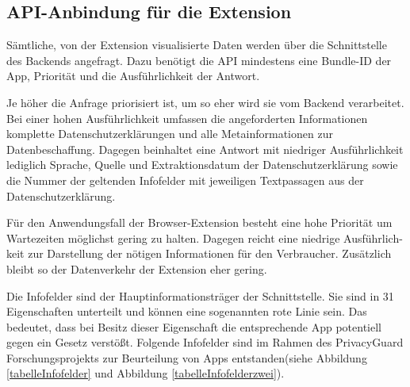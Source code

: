\subsection{API-Anbindung für die Extension}
\label{ss:apianbindung}

Sämtliche, von der Extension visualisierte Daten werden über die Schnittstelle des Backends angefragt. Dazu benötigt die API mindestens eine Bundle-ID der App, Priorität und die Ausführlichkeit der Antwort.

Je höher die Anfrage priorisiert ist, um so eher wird sie vom Backend verarbeitet. 
Bei einer hohen Ausführlichkeit umfassen die angeforderten Informationen komplette Datenschutzerklärungen und alle Metainformationen zur Datenbeschaffung. Dagegen beinhaltet eine Antwort mit niedriger Ausführlichkeit lediglich Sprache, Quelle und Extraktionsdatum der Datenschutzerklärung sowie die Nummer der geltenden Infofelder mit jeweiligen Textpassagen aus der Datenschutzerklärung.

Für den Anwendungsfall der Browser-Extension besteht eine hohe Priorität um Wartezeiten möglichst gering zu halten. Dagegen reicht eine niedrige Ausführlich-keit zur Darstellung der nötigen Informationen für den Verbraucher. Zusätzlich bleibt so der Datenverkehr der Extension eher gering.

Die Infofelder sind der Hauptinformationsträger der Schnittstelle. Sie sind in 31 Eigenschaften unterteilt und können eine sogenannten \glqq rote Linie \grqq{} sein. Das bedeutet, dass bei Besitz dieser Eigenschaft die entsprechende App potentiell gegen ein Gesetz verstößt. Folgende Infofelder sind im Rahmen des PrivacyGuard Forschungsprojekts zur Beurteilung von Apps entstanden(siehe Abbildung \ref{tabelleInfofelder} und Abbildung \ref{tabelleInfofelderzwei}).

